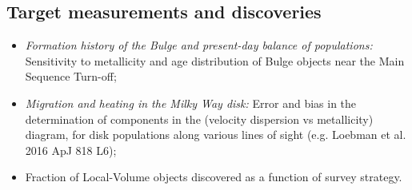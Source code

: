 
\subsection{Target measurements and discoveries}
\label{sec:\secname:MW_Future_targets}


\begin{itemize}
  \item {\it Formation history of the Bulge and present-day balance of populations:} Sensitivity to metallicity and age distribution of Bulge objects near the Main Sequence Turn-off;
    \item {\it Migration and heating in the Milky Way disk:} Error and bias in the determination of components in the (velocity dispersion vs metallicity) diagram, for disk populations along various lines of sight (e.g. Loebman et al. 2016 ApJ 818 L6);
    \item Fraction of Local-Volume objects discovered as a function of survey strategy.
\end{itemize}
















\navigationbar

